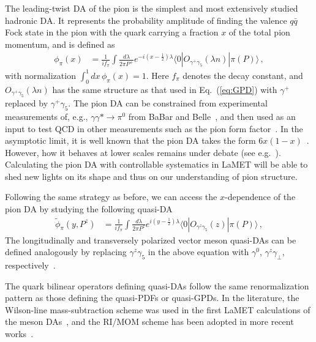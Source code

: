 The leading-twist DA of the pion is the simplest and most extensively studied hadronic DA. It represents the probability amplitude of finding the valence $q\bar q$ Fock state in the pion with the quark carrying a fraction $x$ of the total pion momentum, and is defined as
\begin{align}\label{eq:pionDA}
	\phi_{\pi}(x)&={\frac{1}{if_{\pi}}}\int \frac{d\lambda}{2\pi P^+}e^{-i (x-\frac 1 2)\lambda}\langle 0|O_{\gamma^+\gamma_5}(\lambda n)|\pi(P)\rangle\,,
\end{align}
with normalization $\int_0^1 dx\, \phi_\pi(x)=1$. Here $f_\pi$ denotes the decay constant, and
$O_{\gamma^+\gamma_5}(\lambda n)$ has the same structure as that used in Eq.~(\ref{eq:GPD}) with $\gamma^+$ replaced by $\gamma^+\gamma_5$. The pion DA can be constrained from experimental measurements of, e.g.,
$\gamma \gamma* \rightarrow \pi^0$ from BaBar and Belle~\cite{Aubert:2009mc,Uehara:2012ag},
and then used as an input to test QCD in other measurements such as the pion form factor~\cite{Efremov:1978rn,Farrar:1979aw}.
In the asymptotic limit, it is well known that the pion DA takes the form
$6 x(1-x)$~\cite{Efremov:1978rn,Lepage:1979zb}.
However, how it behaves at lower scales remains under debate (see e.g.~\cite{Chernyak:1981zz}).
%
Calculating the pion DA with controllable systematics in LaMET will be able to shed new lights on its shape and thus on our understanding of pion structure.


Following the same strategy as before, we can access the $x$-dependence of the pion DA by studying the following quasi-DA~\cite{Ji:2015qla,Zhang:2017bzy}
\begin{align}\label{eq:quasiDA}
	\tilde\phi_{\pi}(y, P^z)&={\frac{1}{if_{\pi}}}\int \frac{d\lambda}{2\pi P^z}e^{i (y-\frac 1 2) \lambda}\langle 0|{O}_{\gamma^z\gamma_5}(z)|\pi(P)\rangle\,,
\end{align}
The longitudinally and transversely polarized vector meson quasi-DAs can be defined analogously by replacing $\gamma^z\gamma_5$ in the above equation with $\gamma^0$, $\gamma^z\gamma_\perp$, respectively~\cite{Liu:2018tox}.


The quark bilinear operators defining quasi-DAs follow the same renormalization pattern as those defining the quasi-PDFs or quasi-GPDs.
In the literature, the Wilson-line mass-subtraction scheme was used in the first LaMET calculations of the meson DAs~\cite{Zhang:2017bzy,Chen:2017gck}, and the RI/MOM scheme has been adopted in more recent works~\cite{Zhang:2020gaj}.

